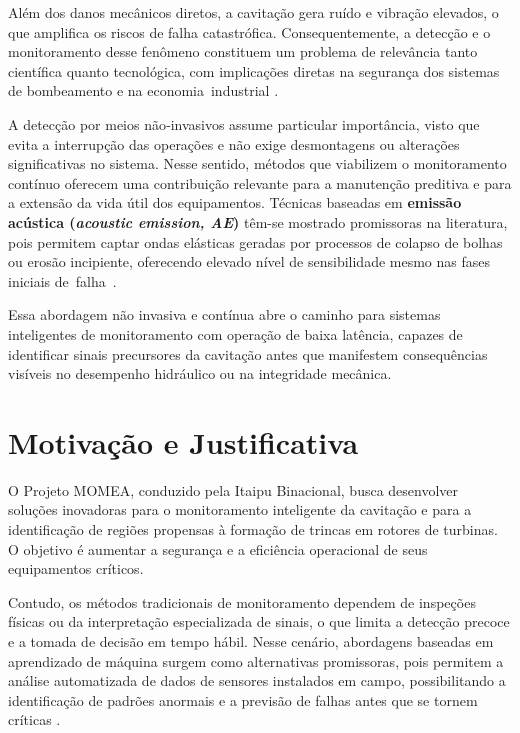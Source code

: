 Além dos danos mecânicos diretos, a cavitação gera ruído e vibração elevados, o que amplifica os riscos de falha catastrófica. Consequentemente, a detecção e o monitoramento desse fenômeno constituem um problema de relevância tanto científica quanto tecnológica, com implicações diretas na segurança dos sistemas de bombeamento e na economia~industrial \cite{liu2023review}.

A detecção por meios não‐invasivos assume particular importância, visto que evita a interrupção das operações e não exige desmontagens ou alterações significativas no sistema. Nesse sentido, métodos que viabilizem o monitoramento contínuo oferecem uma contribuição relevante para a manutenção preditiva e para a extensão da vida útil dos equipamentos. Técnicas baseadas em \textbf{emissão acústica (\textit{acoustic emission, AE})} têm-se mostrado promissoras na literatura, pois permitem captar ondas elásticas geradas por processos de colapso de bolhas ou erosão incipiente, oferecendo elevado nível de sensibilidade mesmo nas fases iniciais \mbox{de falha \cite{Neill1997Detection, Osete2024}.}

Essa abordagem não invasiva e contínua abre o caminho para sistemas inteligentes de monitoramento com operação de baixa latência, capazes de identificar sinais precursores da cavitação antes que manifestem consequências visíveis no desempenho hidráulico ou na integridade mecânica.

\section{Motivação e Justificativa}

O Projeto MOMEA, conduzido pela Itaipu Binacional, busca desenvolver soluções inovadoras para o monitoramento inteligente da cavitação e para a identificação de regiões propensas à formação de trincas em rotores de turbinas. O objetivo é aumentar a segurança e a eficiência operacional de seus equipamentos críticos.

Contudo, os métodos tradicionais de monitoramento dependem de inspeções físicas ou da interpretação especializada de sinais, o que limita a detecção precoce e a tomada de decisão em tempo hábil. Nesse cenário, abordagens baseadas em aprendizado de máquina surgem como alternativas promissoras, pois permitem a análise automatizada de dados de sensores instalados em campo, possibilitando a identificação de padrões anormais e a previsão de falhas antes que se tornem críticas \cite{manikandan2023vibration}.

